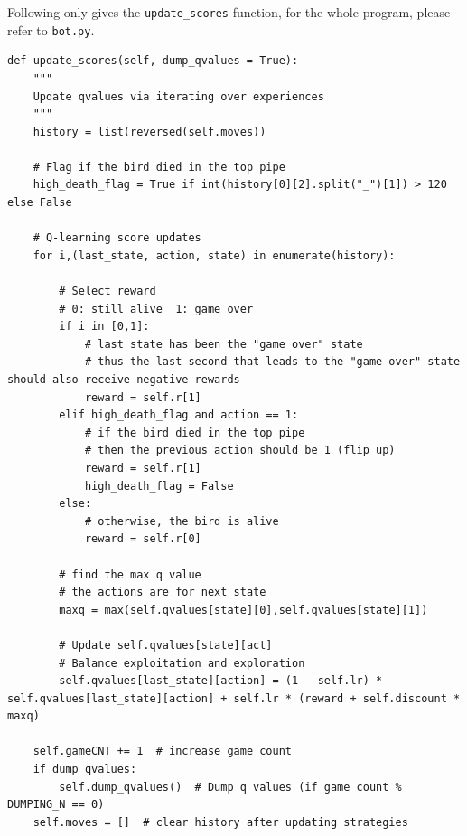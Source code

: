 \documentclass[a4paper, 11pt]{article}
\begin{document}
Following only gives the \verb'update_scores' function, for the whole program, please refer to \verb'bot.py'.
\begin{lstlisting}
def update_scores(self, dump_qvalues = True):
	"""
	Update qvalues via iterating over experiences
	"""
	history = list(reversed(self.moves))

	# Flag if the bird died in the top pipe
	high_death_flag = True if int(history[0][2].split("_")[1]) > 120 else False

	# Q-learning score updates
	for i,(last_state, action, state) in enumerate(history):

		# Select reward
		# 0: still alive  1: game over
		if i in [0,1]:
			# last state has been the "game over" state
			# thus the last second that leads to the "game over" state should also receive negative rewards
			reward = self.r[1]
		elif high_death_flag and action == 1:
			# if the bird died in the top pipe
			# then the previous action should be 1 (flip up)
			reward = self.r[1]
			high_death_flag = False
		else:
			# otherwise, the bird is alive
			reward = self.r[0]

		# find the max q value
        # the actions are for next state
		maxq = max(self.qvalues[state][0],self.qvalues[state][1])

		# Update self.qvalues[state][act]
		# Balance exploitation and exploration
		self.qvalues[last_state][action] = (1 - self.lr) * self.qvalues[last_state][action] + self.lr * (reward + self.discount * maxq)

	self.gameCNT += 1  # increase game count
	if dump_qvalues:
		self.dump_qvalues()  # Dump q values (if game count % DUMPING_N == 0)
	self.moves = []  # clear history after updating strategies
\end{lstlisting}
\end{document}
